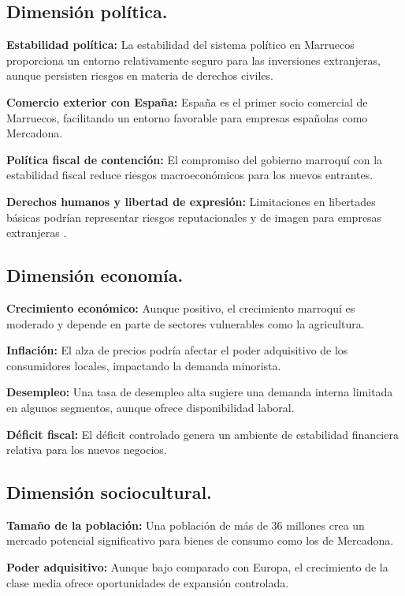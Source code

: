 \documentclass{article}  %
\begin{document}
\subsection{Dimensión política.}\label{dimensiuxf3n-poluxedtica.}

\textbf{Estabilidad política:} La estabilidad del sistema político en
Marruecos proporciona un entorno relativamente seguro para las
inversiones extranjeras, aunque persisten riesgos en materia de derechos
civiles.

\textbf{Comercio exterior con España:} España es el primer socio
comercial de Marruecos, facilitando un entorno favorable para empresas
españolas como Mercadona.

\textbf{Política fiscal de contención:} El compromiso del gobierno
marroquí con la estabilidad fiscal reduce riesgos macroeconómicos para
los nuevos entrantes.

\textbf{Derechos humanos y libertad de expresión:} Limitaciones en
libertades básicas podrían representar riesgos reputacionales y de
imagen para empresas extranjeras .

\subsection{Dimensión economía.}\label{dimensiuxf3n-economuxeda.}

\textbf{Crecimiento económico:} Aunque positivo, el crecimiento marroquí
es moderado y depende en parte de sectores vulnerables como la
agricultura.

\textbf{Inflación:} El alza de precios podría afectar el poder
adquisitivo de los consumidores locales, impactando la demanda
minorista.

\textbf{Desempleo:} Una tasa de desempleo alta sugiere una demanda
interna limitada en algunos segmentos, aunque ofrece disponibilidad
laboral.

\textbf{Déficit fiscal:} El déficit controlado genera un ambiente de
estabilidad financiera relativa para los nuevos negocios.

\subsection{Dimensión sociocultural.}\label{dimensiuxf3n-sociocultural.}

\textbf{Tamaño de la población:} Una población de más de 36 millones
crea un mercado potencial significativo para bienes de consumo como los
de Mercadona.

\textbf{Poder adquisitivo:} Aunque bajo comparado con Europa, el
crecimiento de la clase media ofrece oportunidades de expansión
controlada.
\end{document}
